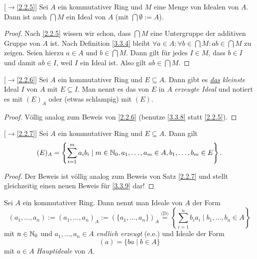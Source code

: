 \documentclass[../../main.tex]{subfiles}
\begin{document}
\begin{pro}{\rm[$\to$\ref{2.2.5}]}\label{3.3.8}
Sei $A$ ein kommutativer Ring und $M$ eine Menge von Idealen von $A$. Dann ist auch $\bigcap M$ ein Ideal von $A$ (mit $\bigcap\emptyset:=A$).
\end{pro}
\begin{proof}
Nach \ref{2.2.5} wissen wir schon, dass $\bigcap M$ eine Untergruppe der additiven Gruppe von $A$ ist. Nach Definition \ref{3.3.4} bleibt $\forall a\in A:\forall b\in\bigcap M:ab\in\bigcap M$ zu zeigen.
Seien hierzu $a\in A$ und $b\in\bigcap M$. Dann gilt für jedes $I\in M$, dass $b\in I$ und damit $ab\in I$, weil $I$ ein Ideal ist. Also gilt $ab\in\bigcap M$.
\end{proof}

\begin{satdef}{\rm[$\to$\ref{2.2.6}]}\label{3.3.9}
Sei $A$ ein kommutativer Ring und $E\subseteq A$. Dann gibt es \emph{\underline{das} kleinste} Ideal $I$ von $A$ mit $E\subseteq I$. Man nennt es das von $E$ in $A$ \emph{erzeugte Ideal} und notiert es mit $(E)_A$ oder (etwas schlampig) mit $(E)$.
\end{satdef}

\begin{proof}
Völlig analog zum Beweis von \ref{2.2.6} (benutze \ref{3.3.8} statt \ref{2.2.5}).
\end{proof}

\begin{sat}{\rm[$\to$\ref{2.2.7}]}\label{3.3.10}
Sei $A$ ein kommutativer Ring und $E\subseteq A$. Dann gilt
$$(E)_A=\left\{\sum_{i=1}^ma_ib_i\mid m\in\mathbb N_0,a_1,\dots,a_m\in A,b_1,\dots,b_m\in E\right\}.$$
\end{sat}
\begin{proof}
Der Beweis ist völlig analog zum Beweis von Satz \ref{2.2.7} und stellt gleichzeitig einen neuen Beweis für \ref{3.3.9} dar!
\end{proof}

\begin{df}\label{3.3.11}
Sei $A$ ein kommutativer Ring. Dann nennt man Ideale von $A$ der Form
$$(a_1,\dots,a_n):=(a_1,\dots,a_n)_A:=(\{a_1,\dots,a_n\})_A\overset{\text{(D)}}=\left\{\sum_{i=1}^nb_ia_i\mid b_1,\dots,b_n\in A\right\}$$
mit $n\in\mathbb N_0$ und $a_1,\dots,a_n\in A$ \emph{endlich erzeugt} (e.e.) und Ideale der Form
$$(a)=\{ba\mid b\in A\}$$ mit $a\in A$ \emph{Hauptideale} von $A$.
\end{df}
\end{document}
